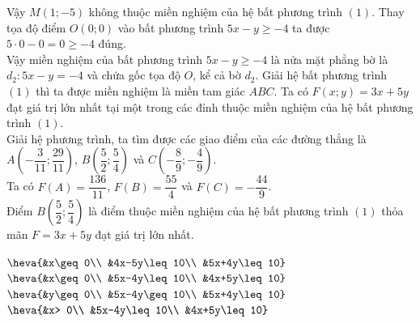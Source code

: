 \begin{ex}
{\begin{itemchoice}
		Vậy $M(1;-5)$ không thuộc miền nghiệm của hệ bất phương trình $(1)$.
		\itemch Thay tọa độ điểm $O(0;0)$ vào bất phương trình $5x-y\ge -4$ ta được $5\cdot 0-0=0\ge -4$ đúng.\\	
		Vậy miền nghiệm của bất phương trình $5x-y\ge-4$ là nửa mặt phẳng bờ là $d_2\colon 5x-y=-4$ và chứa gốc tọa độ $O$,  kể cả bờ $d_2$.
		\itemch Giải hệ bất phương trình $(1)$ thì ta được miền nghiệm là miền tam giác $ABC$.
		\itemch Ta có $F(x;y)=3x+5y$ đạt giá trị lớn nhất tại một trong các đỉnh thuộc miền nghiệm của hệ bất phương trình $(1)$.\\
		Giải hệ phương trình, ta tìm được các giao điểm của các đường thẳng là $A\left(-\dfrac{3}{11};\dfrac{29}{11}\right)$, $B\left(\dfrac{5}{2};\dfrac{5}{4}\right)$ và $C\left(-\dfrac{8}{9};-\dfrac{4}{9}\right)$.\\
		Ta có $F(A)=\dfrac{136}{11}$, $F(B)=\dfrac{55}{4}$ và $F(C)=-\dfrac{44}{9}$.\\
		Điểm $B\left(\dfrac{5}{2};\dfrac{5}{4}\right)$ là điểm thuộc miền nghiệm của hệ bất phương trình $(1)$ thỏa mãn $F=3x+5y$ đạt giá trị lớn nhất.
	\end{itemchoice}
	}
\end{ex}

\begin{ex}%
\choice
{$\heva{&x\geq0\\
		&4x-5y\leq10\\
		&5x+4y\leq10}$}
{\True $\heva{&x\geq0\\
		&5x-4y\leq10\\
		&4x+5y\leq10}$}
{$\heva{&y\geq0\\
		&5x-4y\geq10\\
		&5x+4y\leq10}$}
{$\heva{&x> 0\\
		&5x-4y\leq10\\
		&4x+5y\leq10}$}
\end{ex}

